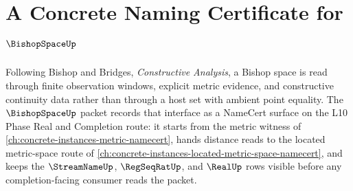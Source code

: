 \chapter{A Concrete Naming Certificate for $\BishopSpaceUp$}
\label{ch:concrete-instances-bishop-space-namecert}

Following Bishop and Bridges, \emph{Constructive Analysis}, a Bishop space is read through finite observation windows, explicit metric evidence, and constructive continuity data rather than through a host set with ambient point equality. The $\BishopSpaceUp$ packet records that interface as a NameCert surface on the L10 Phase Real and Completion route: it starts from the metric witness of \autoref{ch:concrete-instances-metric-namecert}, hands distance reads to the located metric-space route of \autoref{ch:concrete-instances-located-metric-space-namecert}, and keeps the $\StreamNameUp$, $\RegSeqRatUp$, and $\RealUp$ rows visible before any completion-facing consumer reads the packet.

